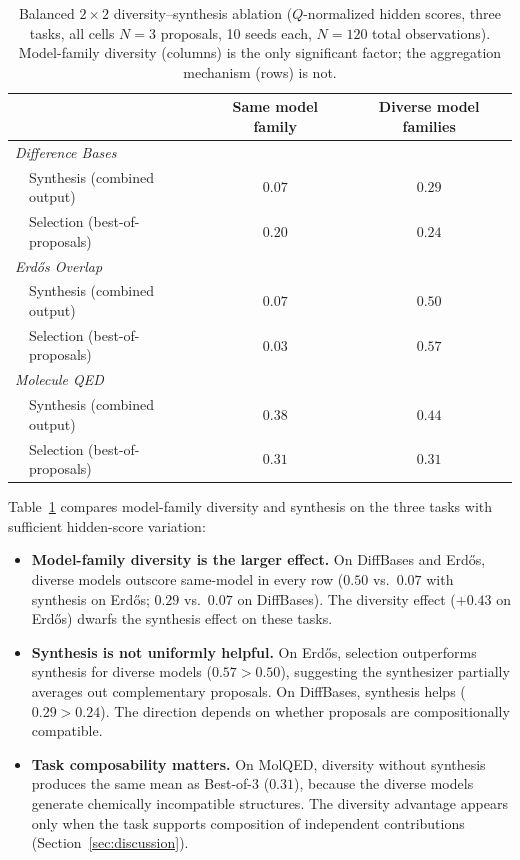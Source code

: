 \documentclass{article}
\begin{document}
\begin{table}[t]
\caption{Balanced $2{\times}2$ diversity--synthesis ablation ($Q$-normalized hidden scores, three tasks, all cells $N{=}3$ proposals, 10 seeds each, $N{=}120$ total observations). Model-family diversity (columns) is the only significant factor; the aggregation mechanism (rows) is not.}
\label{tab:ablation22}
\centering
\small
\begin{tabular}{l l c c}
\toprule
& & Same model family & Diverse model families \\
\midrule
\multicolumn{4}{l}{\textit{Difference Bases}} \\
 \quad & Synthesis (combined output) & $0.07$ & $\mathbf{0.29}$ \\
 \quad & Selection (best-of-proposals) & $0.20$ & $\mathbf{0.24}$ \\
\midrule
\multicolumn{4}{l}{\textit{Erd\H{o}s Overlap}} \\
\quad & Synthesis (combined output) & $0.07$ & $\mathbf{0.50}$ \\
\quad & Selection (best-of-proposals) & $0.03$ & $\mathbf{0.57}$ \\
\midrule
\multicolumn{4}{l}{\textit{Molecule QED}} \\
\quad & Synthesis (combined output) & $0.38$ & $\mathbf{0.44}$ \\
\quad & Selection (best-of-proposals) & $0.31$ & $0.31$ \\
\bottomrule
\end{tabular}
\end{table}

Table~\ref{tab:ablation22} compares model-family diversity and synthesis on the three tasks with sufficient hidden-score variation:

\begin{itemize}
\item \textbf{Model-family diversity is the larger effect.} On DiffBases and Erd\H{o}s, diverse models outscore same-model in every row ($0.50$ vs.\ $0.07$ with synthesis on Erd\H{o}s; $0.29$ vs.\ $0.07$ on DiffBases). The diversity effect ($+0.43$ on Erd\H{o}s) dwarfs the synthesis effect on these tasks.
\item \textbf{Synthesis is not uniformly helpful.} On Erd\H{o}s, selection outperforms synthesis for diverse models ($0.57 > 0.50$), suggesting the synthesizer partially averages out complementary proposals. On DiffBases, synthesis helps ($0.29 > 0.24$). The direction depends on whether proposals are compositionally compatible.
\item \textbf{Task composability matters.} On MolQED, diversity without synthesis produces the same mean as Best-of-3 ($0.31$), because the diverse models generate chemically incompatible structures. The diversity advantage appears only when the task supports composition of independent contributions (Section~\ref{sec:discussion}).
\end{itemize}
\end{document}
